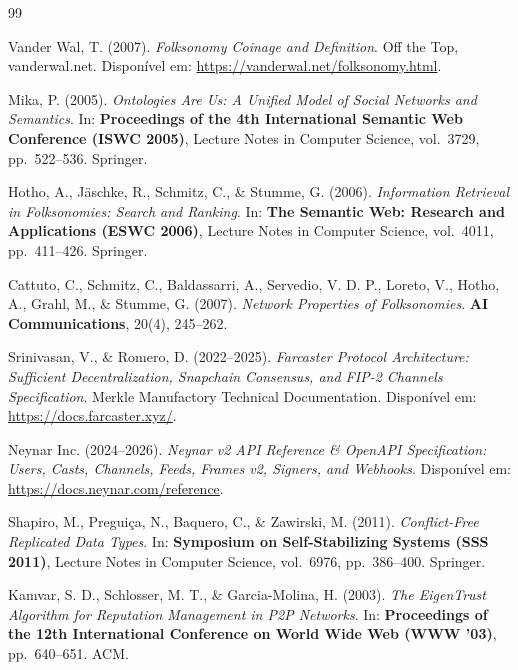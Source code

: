 \documentclass[11pt,a4paper]{article}
\begin{document}
\begin{thebibliography}{99}

Vander Wal, T. (2007).
\emph{Folksonomy Coinage and Definition}.
Off the Top, vanderwal.net. Disponível em: \url{https://vanderwal.net/folksonomy.html}.

Mika, P. (2005).
\emph{Ontologies Are Us: A Unified Model of Social Networks and Semantics}.
In: \textbf{Proceedings of the 4th International Semantic Web Conference (ISWC 2005)}, Lecture Notes in Computer Science, vol.\ 3729, pp.\ 522--536. Springer.

Hotho, A., Jäschke, R., Schmitz, C., \& Stumme, G. (2006).
\emph{Information Retrieval in Folksonomies: Search and Ranking}.
In: \textbf{The Semantic Web: Research and Applications (ESWC 2006)}, Lecture Notes in Computer Science, vol.\ 4011, pp.\ 411--426. Springer.

Cattuto, C., Schmitz, C., Baldassarri, A., Servedio, V. D. P., Loreto, V., Hotho, A., Grahl, M., \& Stumme, G. (2007).
\emph{Network Properties of Folksonomies}.
\textbf{AI Communications}, 20(4), 245--262.

Srinivasan, V., \& Romero, D. (2022--2025).
\emph{Farcaster Protocol Architecture: Sufficient Decentralization, Snapchain Consensus, and FIP-2 Channels Specification}.
Merkle Manufactory Technical Documentation. Disponível em: \url{https://docs.farcaster.xyz/}.

Neynar Inc. (2024--2026).
\emph{Neynar v2 API Reference \& OpenAPI Specification: Users, Casts, Channels, Feeds, Frames v2, Signers, and Webhooks}.
Disponível em: \url{https://docs.neynar.com/reference}.

Shapiro, M., Preguiça, N., Baquero, C., \& Zawirski, M. (2011).
\emph{Conflict-Free Replicated Data Types}.
In: \textbf{Symposium on Self-Stabilizing Systems (SSS 2011)}, Lecture Notes in Computer Science, vol.\ 6976, pp.\ 386--400. Springer.

Kamvar, S. D., Schlosser, M. T., \& Garcia-Molina, H. (2003).
\emph{The EigenTrust Algorithm for Reputation Management in P2P Networks}.
In: \textbf{Proceedings of the 12th International Conference on World Wide Web (WWW '03)}, pp.\ 640--651. ACM.


\end{thebibliography}
\end{document}
